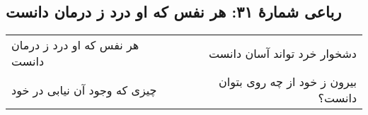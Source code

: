 \begin{center}
\section*{رباعی شمارهٔ ۳۱: هر نفس که او درد ز درمان دانست}
\label{sec:031}
\begin{longtable}{l p{0.5cm} r}
هر نفس که او درد ز درمان دانست
&&
دشخوار خرد تواند آسان دانست
\\
چیزی که وجود آن نیابی در خود
&&
بیرون ز خود از چه روی بتوان دانست؟
\\
\end{longtable}
\end{center}
